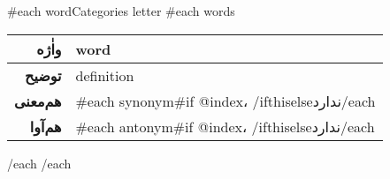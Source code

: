 {{#each wordCategories}}
{{letter}}
{{#each words}}
\begin{center}
	\def\arraystretch{1.5}%
	\begin{tabularx}{\textwidth}{|r|X|}
		\hline
		\textbf{واٰژه}
		&
			{{word}}
		\\ \hline
		\textbf{توضیح}
		&
			{{definition}}
		\\ \hline
		\textbf{هم‌معنی}
		&
			{{#each synonym}}{{#if @index}}، {{/if}}{{this}}{{else}}ندارد{{/each}}
		\\ \hline
		\textbf{هم‌آوا}
		&
			{{#each antonym}}{{#if @index}}، {{/if}}{{this}}{{else}}ندارد{{/each}}
		\\ \hline
	\end{tabularx}
\end{center}
{{/each}}
{{/each}}
